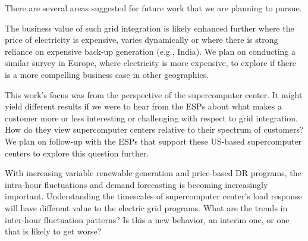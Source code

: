 There are several areas suggested for future work that we are planning to pursue.

The business value of such grid integration is likely enhanced further where the price of 
electricity is expensive, varies dynamically or where there is strong reliance on expensive back-up 
generation (e.g., India).  We plan on conducting a similar survey in Europe, where electricity is more 
expensive, to explore if there is a more compelling business case in other geographies.    

This work’s focus was from the perspective of the supercomputer center.  It might yield different 
results if we were to hear from the ESPs about what makes a customer more or less interesting or 
challenging with respect to grid integration.  How do they view supercomputer centers relative to their 
spectrum of customers?  We plan on follow-up with the ESPs that support these US-based supercomputer 
centers to explore this question further.

With increasing variable renewable generation and price-based DR programs, the intra-hour fluctuations 
and demand forecasting is becoming increasingly important. Understanding the timescales of supercomputer 
center’s load response will have different value to the electric grid programs. What are the trends 
in inter-hour fluctuation patterns?  Is this a new behavior, an interim one, or one that is likely to get worse?  



